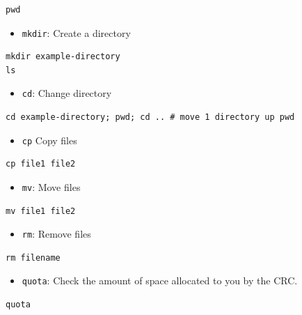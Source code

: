 \documentclass[11pt]{article}
\begin{document}
\begin{verbatim}
pwd
\end{verbatim}

\begin{itemize}
\item \texttt{mkdir}: Create a directory
\end{itemize}

\begin{verbatim}
mkdir example-directory
ls
\end{verbatim}

\begin{itemize}
\item \texttt{cd}: Change directory
\end{itemize}

\begin{verbatim}
cd example-directory; pwd; cd .. # move 1 directory up pwd
\end{verbatim}

\begin{itemize}
\item \texttt{cp} Copy files
\end{itemize}
\begin{verbatim}
cp file1 file2
\end{verbatim}


\begin{itemize}
\item \texttt{mv}: Move files
\end{itemize}
\begin{verbatim}
mv file1 file2
\end{verbatim}

\begin{itemize}
\item \texttt{rm}: Remove files
\end{itemize}
\begin{verbatim}
rm filename
\end{verbatim}

\begin{itemize}
\item \texttt{quota}: Check the amount of space allocated to you by the CRC.
\end{itemize}

\begin{verbatim}
quota
\end{verbatim}
\end{document}
